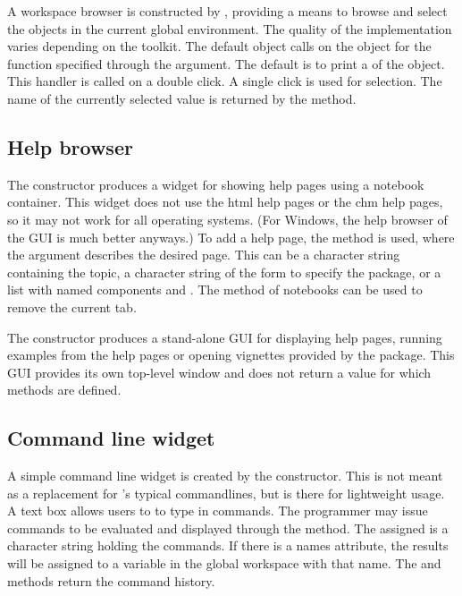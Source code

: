 A workspace browser is constructed by , providing a
means to browse and select the objects in the current global environment. The
quality of the implementation varies depending on the toolkit. The
default  object calls  on the object for
the function specified through the 
argument. The default is to print a  of the object. This
handler is called on a double click. A single click is used for
selection. The name of the currently selected value is returned by the
 method.

\subsection{Help browser}
\label{sec:gWidgets-help-browser}

The  constructor produces a widget for showing help
pages using a notebook container. This widget does not use the html
help pages or the chm help pages, so it may not work for all operating
systems. (For Windows, the help browser of the GUI is much better
anyways.) To add a help page, the  method is used,
where the  argument describes the desired page. This can
be a character string containing the topic, a character string of the
form  to specify the package, or a list with
named components  and .  The
 method of notebooks can be used to remove the
current tab.

The  constructor produces a stand-alone
GUI for displaying help pages, running examples from the help pages or
opening vignettes provided by the package. This GUI provides its own
top-level window and does not return a value for which methods are defined.



\subsection{Command line widget}
\label{sec:gWidgets-command-line-widget}

A simple command line widget is created by the
 constructor. This is not meant as a
replacement for \R's typical commandlines, but is there for
lightweight usage. A text box allows users to to type in \R\/
commands. The programmer may issue commands to be evaluated and
displayed through the  method. The
 assigned is a character string holding the commands. If
there is a names attribute, the results will be assigned to a variable
in the global workspace with that name. The  and \code{[}
methods return the command history.

